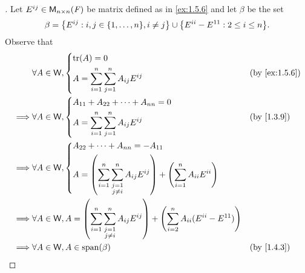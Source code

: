 \begin{proof}[]
	Let \(E^{i j} \in \mathsf{M}_{{n} \times n}({\mathit{F}})\) be matrix defined as in \cref{ex:1.5.6} and let \(\beta\) be the set
	\[
		\beta = \set{E^{i j} : i, j \in \set{1, \dots, n}, i \neq j} \cup \set{E^{i i} - E^{1 1} : 2 \leq i \leq n}.
	\]
	Observe that
	\begin{align*}
		         & \forall A \in \W, \begin{dcases}
			                             \tr[A] = 0 \\
			                             A = \sum_{i = 1}^n \sum_{j = 1}^n A_{i j} E^{i j}
		                             \end{dcases}                                                                                                                                                                         &  & \by{ex:1.5.6}                  \\
		\implies & \forall A \in \W, \begin{dcases}
			                             A_{1 1} + A_{2 2} + \cdots + A_{n n} = 0 \\
			                             A = \sum_{i = 1}^n \sum_{j = 1}^n A_{i j} E^{i j}
		                             \end{dcases}                                                                                                                                                                         &  & \by{1.3.9}                     \\
		\implies & \forall A \in \W, \begin{dcases}
			                             A_{2 2} + \cdots + A_{n n} = -A_{1 1}        \\
			                             A = \pa{\sum_{i = 1}^n \sum_{\substack{j = 1 \\ j \neq i}}^n A_{i j} E^{i j}} + \pa{\sum_{i = 1}^n A_{i i} E^{i i}}
		                             \end{dcases} \\
		\implies & \forall A \in \W, A = \pa{\sum_{i = 1}^n \sum_{\substack{j = 1                                                                                                                                                                             \\ j \neq i}}^n A_{i j} E^{i j}} + \pa{\sum_{i = 2}^n A_{i i} (E^{i i} - E^{1 1})} \\
		\implies & \forall A \in \W, A \in \spn{\beta}                                                                                                                                                                                       &  & \by{1.4.3}  \\

\end{align*}
\end{proof}
